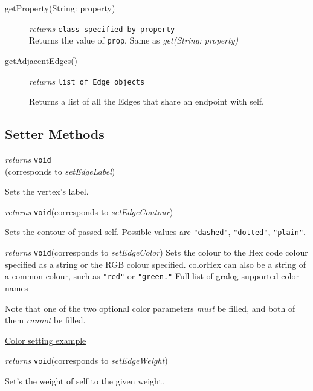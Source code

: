 \begin{description}
\item[getProperty(String: property)] \emph{returns} \texttt{class specified by property}\\
Returns the value of \texttt{prop}. 
Same as \textit{get(String: property)}

\item[getAdjacentEdges()]\emph{returns}
  \texttt{list of Edge objects}

Returns a list of all the Edges that share an endpoint with self.

\end{description}
\subsection{Setter Methods}
\begin{description}
\label{setEdgeLabelClass}\item[setLabel(String: label)]\emph{returns} \texttt{void}\\\quad(corresponds to \textit{setEdgeLabel})

Sets the vertex's label.

\label{setEdgeContourClass}\item[setContour(str: contour)] \emph{returns} \texttt{void}\quad(corresponds to \textit{setEdgeContour})

Sets the contour of passed self. Possible values are
\texttt{"dashed"}, \texttt{"dotted"}, \texttt{"plain"}.

\label{setEdgeColorClass}\item[setColor({[string: colorHex]},{[(int,int,int): colorRGB]})]\emph{returns} \texttt{void}\quad(corresponds to \textit{setEdgeColor})
Sets the colour to the Hex code colour
specified as a string or the RGB colour specified. colorHex can also be
a string of a common colour, such as \texttt{"red"} or
\texttt{"green."} \hyperref[colorNamesSupportedByGralog]{Full list of gralog supported color names}

Note that one of the two optional color parameters \textit{must} be filled, and both of them \textit{cannot} be filled.

\hyperref[colorNamesSupportedByGralog]{Color setting example}

\label{setEdgeWeightClass}\item[setWeight({float: weight})]\emph{returns} \texttt{void}\quad(corresponds to \textit{setEdgeWeight})

Set's the weight of self to the given weight.


\end{description}
